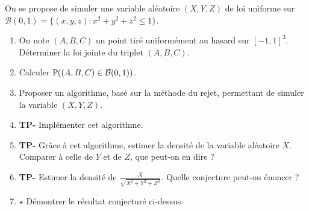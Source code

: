 \documentclass[solutions]{exercices}
\begin{document}
\begin{exercice}
On se propose de simuler une variable aléatoire $(X,Y,Z)$ de loi uniforme sur $\mathcal{B}(0,1) = \{(x,y,z) : x^2 + y^2 + z^2 \leq 1\}$.
\begin{enumerate}
  \item On note $(A,B,C)$ un point tiré uniformément au hasard sur $[-1,1]^3$. Déterminer la loi jointe du triplet $(A,B,C)$.
  \item Calculer $\P((A,B,C) \in \mathcal{B}(0,1))$.
  \item Proposer un algorithme, basé sur la méthode du rejet, permettant de simuler la variable $(X,Y,Z)$.
  \item \textbf{TP-} Implémenter cet algorithme.
  \item \textbf{TP-} Grâce à cet algorithme, estimer la densité de la variable aléatoire $X$. Comparer à celle de $Y$ et de $Z$, que peut-on en dire ?
  \item \textbf{TP-} Estimer la densité de $\frac{X}{\sqrt{X^2 + Y^2 + Z^2}}$. Quelle conjecture peut-on énoncer ?
  \item $\star$ Démontrer le résultat conjecturé ci-dessus.
\end{enumerate}
\end{exercice}
\end{document}
